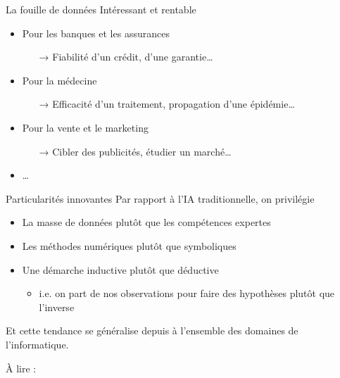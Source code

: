\documentclass[hyperref={unicode}, xcolor={svgnames}, french]{beamer}
\begin{document}
\begin{frame}{La fouille de données}
    Intéressant et rentable
    \begin{itemize}
        \item Pour les banques et les assurances
            \begin{itemize}
                \item[→] Fiabilité d'un crédit, d'une garantie…
            \end{itemize}
        \item Pour la médecine
            \begin{itemize}
                \item[→] Efficacité d'un traitement, propagation d'une épidémie…
            \end{itemize}
        \item Pour la vente et le marketing
            \begin{itemize}
                \item[→] Cibler des publicités, étudier un marché…
            \end{itemize}
        \item …
    \end{itemize}
\end{frame}

\begin{frame}{Particularités innovantes}
    Par rapport à l'IA traditionnelle, on privilégie
    \begin{itemize}
        \item \alert{La masse de données} plutôt que les compétences expertes
        \item \alert{Les méthodes numériques} plutôt que symboliques
        \item Une démarche \alert{inductive} plutôt que déductive
            \begin{itemize}
                \item i.e. on part de nos observations pour faire des hypothèses plutôt que l'inverse
            \end{itemize}

    \end{itemize}
    Et cette tendance se généralise depuis à l'ensemble des domaines de l'informatique.

    À lire :  \parencite{church2011pendulum}
\end{frame}
\end{document}
